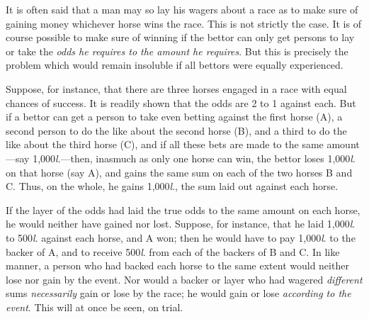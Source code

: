 \documentclass[letterpaper,12pt,oneside,openany]{memoir}
\begin{document}
It is often said that a man may so lay his wagers
about a race as to make sure of gaining money whichever
horse wins the race. This is not strictly the case.
It is of course possible to make sure of winning if the
bettor can only get persons to lay or take the \textit{odds he
requires to the amount he requires}. But this is precisely
the problem which would remain insoluble if all bettors
were equally experienced.

Suppose, for instance, that there are three horses
engaged in a race with equal chances of success. It is
readily shown that the odds are 2 to 1 against each.
But if a bettor can get a person to take even betting
against the first horse (A), a second person to do the
like about the second horse (B), and a third to do the
like about the third horse (C), and if all these bets are
made to the same amount---say 1,000\textit{l}.---then, inasmuch
as only one horse can win, the bettor loses 1,000\textit{l}.
on that horse (say A), and gains the same sum
on each of the two horses B and C. Thus, on the
whole, he gains 1,000\textit{l}., the sum laid out against each
horse.

If the layer of the odds had laid the true odds to the
same amount on each horse, he would neither have
gained nor lost. Suppose, for instance, that he laid
1,000\textit{l}. to 500\textit{l}. against each horse, and A won; then
he would have to pay 1,000\textit{l}. to the backer of A, and to
receive 500\textit{l}. from each of the backers of B and C.
In like manner, a person who had backed each horse
to the same extent would neither lose nor gain by the
event. Nor would a backer or layer who had wagered
\emph{different} sums \emph{necessarily} gain or lose by the race; he
would gain or lose \emph{according to the event}. This will at
once be seen, on trial.
\end{document}

